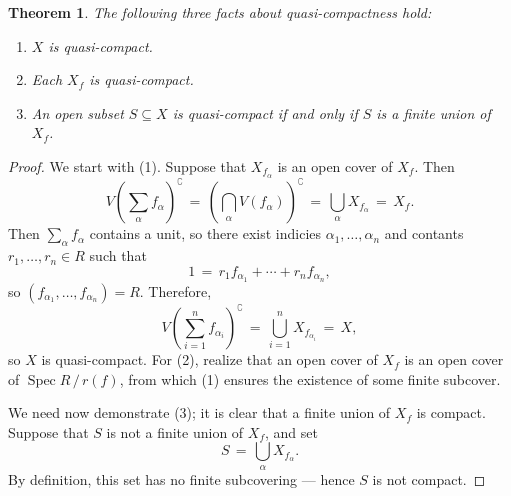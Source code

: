 \documentclass[11pt]{article}
\newtheorem{theorem}{Theorem}
\newcommand{\Spec}{\operatorname{Spec}}
\begin{document}
\begin{adjustwidth}{0.5cm}{}
  \begin{theorem}
    The following three facts about quasi-compactness hold:
    \begin{enumerate}
      \item $X$ is quasi-compact.
      \item Each $X_{f}$ is quasi-compact.
      \item An open subset $S \subseteq X$ is quasi-compact if and only if $S$ is a finite union of $X_{f}$.
    \end{enumerate}
  \end{theorem}
  \begin{proof}
    We start with (1). Suppose that $X_{f_{\alpha}}$ is an open cover of $X_{f}$. Then 
    \[
      V \left( \sum\limits_{\alpha} f_{\alpha}  \right)^{\complement} \, = \, \left( \bigcap\limits_{\alpha} V(f_{\alpha}) \right)^{\complement} \, = \, \bigcup\limits_{\alpha} X_{f_{\alpha}} \, = \, X_{f}.
    \]
    Then $\sum\limits_{\alpha} f_{\alpha}$ contains a unit, so there exist indicies $\alpha_{1}, \ldots, \alpha_{n}$ and contants $r_{1}, \ldots, r_{n} \in R$ such that
    \[
      1 \, = \, r_{1} f_{\alpha_{1}} + \cdots + r_{n} f_{\alpha_{n}},
    \]
    so $(f_{\alpha_{1}}, \ldots, f_{\alpha_{n}}) = R$. Therefore,
    \[
      V \left( \sum\limits_{i = 1}^{n} f_{\alpha_{i}} \right)^{\complement} \, = \, \bigcup\limits_{i = 1}^{n} X_{f_{\alpha_{i}}} \, = \, X,
    \]
    so $X$ is quasi-compact. For (2), realize that an open cover of $X_{f}$ is an open cover of $\Spec R \, / \, r(f)$, from which (1) ensures the existence of some finite subcover. 

    We need now demonstrate (3); it is clear that a finite union of $X_{f}$ is compact. Suppose that $S$ is not a finite union of $X_{f}$, and set
    \[
      S \, = \, \bigcup\limits_{\alpha} X_{f_{\alpha}}.
    \]
    By definition, this set has no finite subcovering --- hence $S$ is not compact.
  \end{proof}
\end{adjustwidth}

\end{document}
